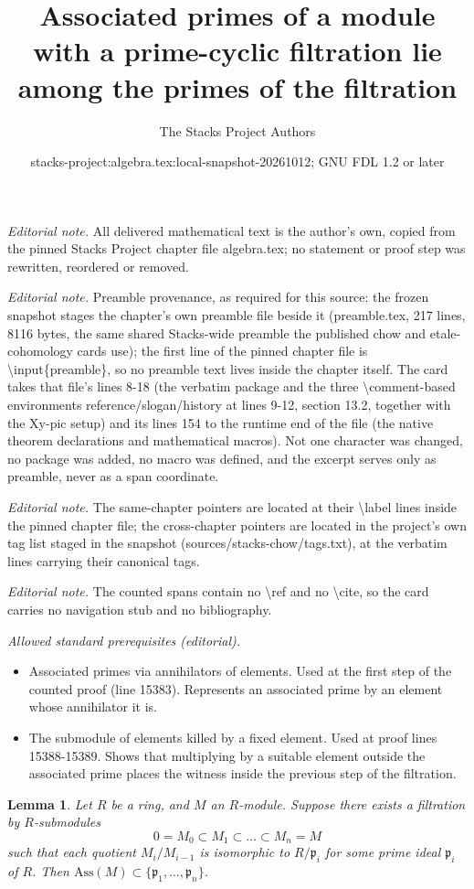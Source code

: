\documentclass[10pt,a4paper]{amsart}
\title{Associated primes of a module with a prime-cyclic filtration lie among the primes of the filtration}
\author{The Stacks Project Authors}
\date{stacks-project:algebra.tex:local-snapshot-20261012; GNU FDL 1.2 or later}
\theoremstyle{plain}
\newtheorem{lemma}[subsection]{Lemma}
\theoremstyle{definition}
\theoremstyle{remark}
\numberwithin{equation}{subsection}
\begin{document}
\maketitle
\noindent\textit{Editorial note.} All delivered mathematical text is the author's own, copied from the pinned Stacks Project chapter file algebra.tex; no statement or proof step was rewritten, reordered or removed.\par\medskip
\noindent\textit{Editorial note.} Preamble provenance, as required for this source: the frozen snapshot stages the chapter's own preamble file beside it (preamble.tex, 217 lines, 8116 bytes, the same shared Stacks-wide preamble the published chow and etale-cohomology cards use); the first line of the pinned chapter file is \textbackslash{}input\{preamble\}, so no preamble text lives inside the chapter itself. The card takes that file's lines 8-18 (the verbatim package and the three \textbackslash{}comment-based environments reference/slogan/history at lines 9-12, section 13.2, together with the Xy-pic setup) and its lines 154 to the runtime end of the file (the native theorem declarations and mathematical macros). Not one character was changed, no package was added, no macro was defined, and the excerpt serves only as preamble, never as a span coordinate.\par\medskip
\noindent\textit{Editorial note.} The same-chapter pointers are located at their \textbackslash{}label lines inside the pinned chapter file; the cross-chapter pointers are located in the project's own tag list staged in the snapshot (sources/stacks-chow/tags.txt), at the verbatim lines carrying their canonical tags.\par\medskip
\noindent\textit{Editorial note.} The counted spans contain no \textbackslash{}ref and no \textbackslash{}cite, so the card carries no navigation stub and no bibliography.\par\medskip
\noindent\textit{Allowed standard prerequisites (editorial).}\begin{itemize}
\item Associated primes via annihilators of elements. Used at the first step of the counted proof (line 15383). Represents an associated prime by an element whose annihilator it is.
\item The submodule of elements killed by a fixed element. Used at proof lines 15388-15389. Shows that multiplying by a suitable element outside the associated prime places the witness inside the previous step of the filtration.
\end{itemize}\medskip
\begin{lemma}
\label{lemma-ass-filter}
Let $R$ be a ring, and $M$ an $R$-module.
Suppose there exists a filtration by $R$-submodules
$$
0 = M_0 \subset M_1 \subset \ldots \subset M_n = M
$$
such that each quotient $M_i/M_{i-1}$ is isomorphic to $R/\mathfrak p_i$
for some prime ideal $\mathfrak p_i$ of $R$.
Then $\text{Ass}(M) \subset \{\mathfrak p_1, \ldots, \mathfrak p_n\}$.
\end{lemma}
\end{document}
